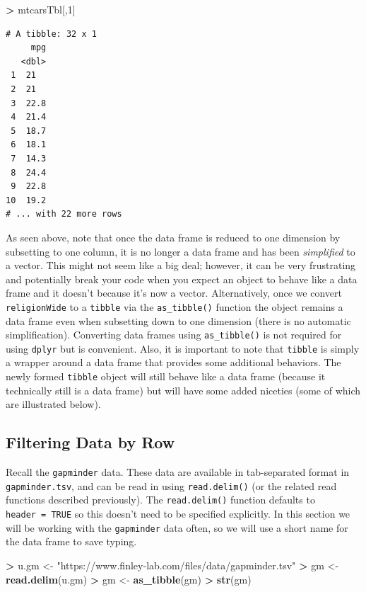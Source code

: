 \documentclass[
]{krantz}
\makeatletter
\newenvironment{Shaded}{\begin{snugshade}}{\end{snugshade}}
\newcommand{\DecValTok}[1]{\textcolor[rgb]{0.06,0.06,0.06}{#1}}
\newcommand{\KeywordTok}[1]{\textcolor[rgb]{0.27,0.27,0.27}{\textbf{#1}}}
\newcommand{\NormalTok}[1]{#1}
\newcommand{\OperatorTok}[1]{\textcolor[rgb]{0.43,0.43,0.43}{\textbf{#1}}}
\newcommand{\StringTok}[1]{\textcolor[rgb]{0.5,0.5,0.5}{#1}}
\newenvironment{kframe}{%
\medskip{}
\setlength{\fboxsep}{.8em}
 \def\at@end@of@kframe{}%
 \ifinner\ifhmode%
  \def\at@end@of@kframe{\end{minipage}}%
  \begin{minipage}{\columnwidth}%
 \fi\fi%
 \def\FrameCommand##1{\hskip\@totalleftmargin \hskip-\fboxsep
 \colorbox{shadecolor}{##1}\hskip-\fboxsep
     \hskip-\linewidth \hskip-\@totalleftmargin \hskip\columnwidth}%
 \MakeFramed {\advance\hsize-\width
   \@totalleftmargin\z@ \linewidth\hsize
   \@setminipage}}%
 {\par\unskip\endMakeFramed%
 \at@end@of@kframe}
\renewenvironment{Shaded}{\begin{kframe}}{\end{kframe}}
\makeatother
\begin{document}
\begin{Shaded}
\begin{Highlighting}[]
\OperatorTok{\textgreater{}}\StringTok{ }\NormalTok{mtcarsTbl[,}\DecValTok{1}\NormalTok{]}
\end{Highlighting}
\end{Shaded}

\begin{verbatim}
# A tibble: 32 x 1
     mpg
   <dbl>
 1  21  
 2  21  
 3  22.8
 4  21.4
 5  18.7
 6  18.1
 7  14.3
 8  24.4
 9  22.8
10  19.2
# ... with 22 more rows
\end{verbatim}

As seen above, note that once the data frame is reduced to one dimension by subsetting to one column, it is no longer a data frame and has been \emph{simplified} to a vector. This might not seem like a big deal; however, it can be very frustrating and potentially break your code when you expect an object to behave like a data frame and it doesn't because it's now a vector. Alternatively, once we convert \texttt{religionWide} to a \texttt{tibble} via the \texttt{as\_tibble()} function the object remains a data frame even when subsetting down to one dimension (there is no automatic simplification). Converting data frames using \texttt{as\_tibble()} is not required for using \texttt{dplyr} but is convenient. Also, it is important to note that \texttt{tibble} is simply a wrapper around a data frame that provides some additional behaviors. The newly formed \texttt{tibble} object will still behave like a data frame (because it technically still is a data frame) but will have some added niceties (some of which are illustrated below).

\hypertarget{filtering-data-by-row}{%
\subsection{Filtering Data by Row}\label{filtering-data-by-row}}

Recall the \texttt{gapminder} data. These data are available in tab-separated format in \texttt{gapminder.tsv}, and can be read in using \texttt{read.delim()} (or the related read functions described previously). The \texttt{read.delim()} function defaults to \texttt{header\ =\ TRUE} so this doesn't need to be specified explicitly. In this section we will be working with the \texttt{gapminder} data often, so we will use a short name for the data frame to save typing.

\begin{Shaded}
\begin{Highlighting}[]
\OperatorTok{\textgreater{}}\StringTok{ }\NormalTok{u.gm \textless{}{-}}\StringTok{ "https://www.finley{-}lab.com/files/data/gapminder.tsv"}
\OperatorTok{\textgreater{}}\StringTok{ }\NormalTok{gm \textless{}{-}}\StringTok{ }\KeywordTok{read.delim}\NormalTok{(u.gm)}
\OperatorTok{\textgreater{}}\StringTok{ }\NormalTok{gm \textless{}{-}}\StringTok{ }\KeywordTok{as\_tibble}\NormalTok{(gm)}
\OperatorTok{\textgreater{}}\StringTok{ }\KeywordTok{str}\NormalTok{(gm)}
\end{Highlighting}
\end{Shaded}
\end{document}
